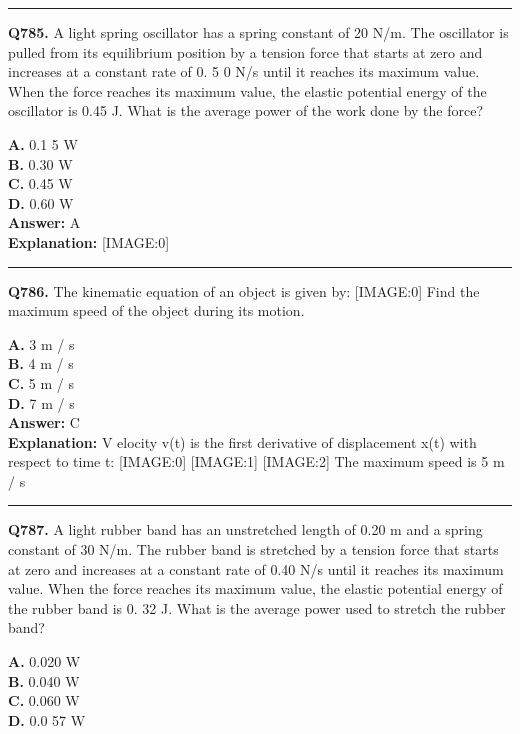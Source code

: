 \documentclass[12pt]{article}
\begin{document}
\hrule
\vspace{1em}


\noindent
\textbf{Q785.} A light spring oscillator has a spring constant of 20 N/m. The oscillator is pulled from its equilibrium position by a tension force that starts at zero and increases at a constant rate of 0.
5
0 N/s until it reaches its maximum value. When the force reaches its maximum value, the elastic potential energy of the oscillator is 0.45 J. What is the average power of the work done by the force?



\textbf{A.} 0.1
5
W \\
\textbf{B.} 0.30 W \\
\textbf{C.} 0.45 W \\
\textbf{D.} 0.60 W \\

\textbf{Answer:} A \\
\textbf{Explanation:} [IMAGE:0]

\hrule
\vspace{1em}


\noindent
\textbf{Q786.} The kinematic equation of an object is given by:
[IMAGE:0]
Find the maximum speed of the object during its motion.



\textbf{A.} 3
m
/
s \\
\textbf{B.} 4
m
/
s \\
\textbf{C.} 5
m
/
s \\
\textbf{D.} 7
m
/
s \\

\textbf{Answer:} C \\
\textbf{Explanation:} V
elocity v(t) is the first derivative of displacement x(t) with respect to time t:
[IMAGE:0]
[IMAGE:1]
[IMAGE:2]
The maximum speed is 5
m
/
s

\hrule
\vspace{1em}


\noindent
\textbf{Q787.} A light rubber band has an unstretched length of 0.20 m and a spring constant of 30 N/m. The rubber band is stretched by a tension force that starts at zero and increases at a constant rate of 0.40 N/s until it reaches its maximum value. When the force reaches its maximum value, the elastic potential energy of the rubber band is 0.
32
J. What is the average power used to stretch the rubber band?



\textbf{A.} 0.020 W \\
\textbf{B.} 0.040 W \\
\textbf{C.} 0.060 W \\
\textbf{D.} 0.0
57
W \\
\end{document}
